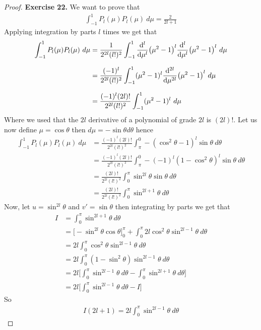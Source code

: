 \documentclass[11pt]{article}
\theoremstyle{definition}
\begin{document}
\cleardoublepage
\begin{proof}{\textbf{Exercise 22.}}
We want to prove that
\begin{align*}
\int_{-1}^1 P_l(\mu)P_l(\mu)~d\mu = \frac{2}{2l + 1}
\end{align*}
Applying integration by parts $l$ times we get that
\begin{align*}
\int_{-1}^1 P_l(\mu)P_l(\mu)~d\mu
&= \frac{1}{2^{2l}(l!)^2}\int_{-1}^1
    \dv[l]{\mu}(\mu^2 - 1)^l \dv[l]{\mu}(\mu^2 - 1)^l ~d\mu\\[7pt]
&= \frac{(-1)^l}{2^{2l}(l!)^2}\int_{-1}^1
    (\mu^2 - 1)^l \dv[2l]{\mu}(\mu^2 - 1)^l~d\mu\\[7pt]
&= \frac{(-1)^l(2l)!}{2^{2l}(l!)^2}\int_{-1}^1 (\mu^2 - 1)^l~d\mu
\end{align*}
Where we used that the $2l$ derivative of a polynomial of grade $2l$ is $(2l)!$.
Let us now define $\mu = \cos\theta$ then $d\mu = -\sin\theta d\theta$ hence
\begin{align*}
\int_{-1}^1 P_l(\mu)P_l(\mu)~d\mu
&= \frac{(-1)^l(2l)!}{2^{2l}(l!)^2}\int_{\pi}^{0}
    -(\cos^2\theta - 1)^l\sin\theta~d\theta \\[7pt]
&= \frac{(-1)^l(2l)!}{2^{2l}(l!)^2}\int_{\pi}^{0}
    -(-1)^l(1 - \cos^2\theta)^l\sin\theta~d\theta \\[7pt]
&= \frac{(2l)!}{2^{2l}(l!)^2}\int_{0}^{\pi}
    \sin^{2l}\theta\sin\theta~d\theta \\[7pt]
&= \frac{(2l)!}{2^{2l}(l!)^2}\int_{0}^{\pi} \sin^{2l + 1}\theta~d\theta
\end{align*}
Now, let $u = \sin^{2l}\theta$ and $v' = \sin\theta$ then integrating by parts
we get that
\begin{align*}
I &= \int_{0}^{\pi} \sin^{2l + 1}\theta~d\theta\\
&= \bigg[-\sin^{2l}\theta\cos\theta\bigg]_0^{\pi}
+ \int_{0}^{\pi} 2l\cos^2\theta\sin^{2l - 1}\theta ~d\theta\\
&= 2l\int_{0}^{\pi} \cos^2\theta\sin^{2l - 1}\theta ~d\theta\\
&= 2l\int_{0}^{\pi} (1 - \sin^2\theta)\sin^{2l - 1}\theta ~d\theta\\
&= 2l\bigg[
    \int_{0}^{\pi} \sin^{2l - 1}\theta ~d\theta
    - \int_{0}^{\pi} \sin^{2l + 1}\theta ~d\theta
\bigg]\\
&= 2l\bigg[\int_{0}^{\pi} \sin^{2l - 1}\theta ~d\theta - I\bigg]
\end{align*}
So
\begin{align*}
I(2l + 1) = 2l\int_{0}^{\pi} \sin^{2l - 1}\theta ~d\theta

\end{align*}
\end{proof}
\end{document}
